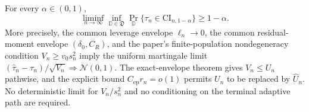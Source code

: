 For every \(\alpha\in(0,1)\), \[\liminf_{n\to\infty}\inf_{\mathbb D\in\mathfrak D}\Pr_{\mathbb D}\{\tau_n\in\mathrm{CI}_{n,1-\alpha}\}\ge1-\alpha.\] More precisely, the common leverage envelope \(\ell_n\to0\), the common residual-moment envelope \((\delta_0,C_R)\), and the paper's finite-population nondegeneracy condition \(V_n\ge v_0s_n^2\) imply the uniform martingale limit \((\widehat\tau_n-\tau_n)/\sqrt{V_n}\Rightarrow\mathcal N(0,1)\). The exact-envelope theorem gives \(V_n\le U_n\) pathwise, and the explicit bound \(C_{\mathrm{ep}}r_n=o(1)\) permits \(U_n\) to be replaced by \(\widehat U_n\). No deterministic limit for \(V_n/s_n^2\) and no conditioning on the terminal adaptive path are required.
